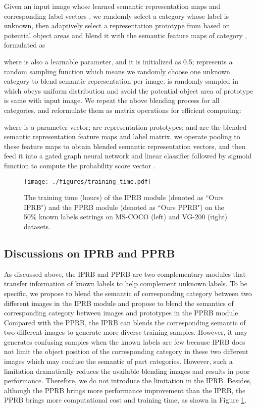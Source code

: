 \documentclass[lettersize,journal]{IEEEtran}
\begin{document}
Given an input image  whose learned semantic representation maps  and corresponding label vectors , we randomly select a category  whose label is unknown, then adaptively select a representation prototype from  based on potential object areas and blend it with the semantic feature maps of category , formulated as 



where  is also a learnable parameter, and it is initialized as 0.5;  represents a random sampling function which means we randomly choose one unknown category to blend semantic representation per image;  is randomly sampled in  which obeys uniform distribution and avoid the potential object area of prototype is same with input image. We repeat the above blending process for all categories, and reformulate them as matrix operations for efficient computing: 


where  is a parameter vector;  are representation prototypes;  and  are the blended semantic representation feature maps and label matrix.  we operate pooling to these feature maps to obtain blended semantic representation vectors, and then feed it into a gated graph neural network and linear classifier followed by sigmoid function to compute the probability score vector .

\begin{figure}[!h]
   \centering
   \texttt{[image: ./figures/training\_time.pdf]}
   \caption{The training time (hours) of the IPRB module (denoted as ``Ours IPRB") and the PPRB module (denoted as ``Ours PPRB") on the 50\% known labels settings on MS-COCO (left) and VG-200 (right) datasets.}
   \label{fig:training-time}
\end{figure}

\subsection{Discussions on IPRB and PPRB}
As discussed above, the IPRB and PPRB are two complementary modules that transfer information of known labels to help complement unknown labels. To be specific, we propose to blend the semantic of  corresponding category between two different images in the IPRB module and propose to blend the semantics of corresponding category between images and prototypes in the PPRB module. Compared with the PPRB, the IPRB can blends the corresponding semantic of two different images to generate more diverse training samples. However, it may generates confusing samples when the known labels are few because IPRB does not limit the object position of the corresponding category in these two different images which may confuse the semantic of part categories. However, such a limitation dramatically reduces the available blending images and results in poor performance. Therefore, we do not introduce the limitation in the IPRB. Besides, although the PPRB brings more performance improvement than the IPRB, the PPRB brings more computational cost and training time, as shown in Figure \ref{fig:training-time}.
\end{document}
